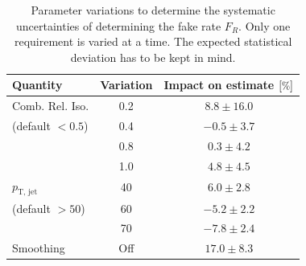 \begin{table}[htb!]
  \centering
  \begin{tabular}{|l|c|c|}
    \hline
    Quantity            & Variation & Impact on estimate $[\pct]$ \\
    \hline
    \hline
    Comb. Rel. Iso.     & 0.2       & $8.8 \pm 16.0$              \\
    (default $< 0.5$)   & 0.4       & $-0.5\pm 3.7$               \\
                        & 0.8       & $0.3 \pm 4.2$               \\
                        & 1.0       & $4.8 \pm 4.5$               \\
    \hline
    $p_{\text{T, jet}}$     & 40        & $6.0 \pm 2.8$               \\
    (default $> 50$)    & 60        & $-5.2 \pm 2.2$              \\
                        & 70        & $-7.8 \pm 2.4$              \\
    \hline
    Smoothing           & Off       & $17.0 \pm 8.3$              \\
    \hline
  \end{tabular}
  \caption{Parameter variations to determine the systematic uncertainties of determining the fake rate $F_R$. Only one requirement is varied at a time. The expected statistical deviation has to be kept in mind.}
  \label{tab:tlratiosys}
\end{table}

 
